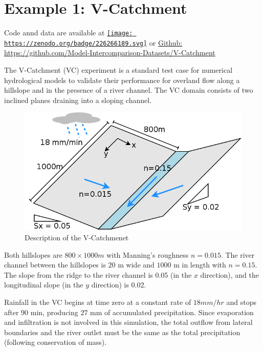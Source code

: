 \documentclass[
]{scrbook}
\begin{document}
\hypertarget{example-1-v-catchment}{%
\section{Example 1: V-Catchment}\label{example-1-v-catchment}}

Code annd data are available at \href{https://zenodo.org/badge/latestdoi/226266189}{\texttt{[image: https://zenodo.org/badge/226266189.svg]}} or \href{https://github.com/Model-Intercomparison-Datasets/V-Catchment}{Github: https://github.com/Model-Intercomparison-Datasets/V-Catchment}

The V-Catchment (VC) experiment is a standard test case for numerical hydrological models to validate their performance for overland flow along a hillslope and in the presence of a river channel.
The VC domain consists of two inclined planes draining into a sloping channel.

\begin{figure}
\centering
\includegraphics{Fig/Example/vCat/Vcat.png}
\caption{Description of the V-Catchmenet}
\end{figure}

Both hillslopes are \(800 \times 1000 m\) with Manning's roughness \(n=0.015\). The river channel between the hillslopes is \(20\) m wide and \(1000\) m in length with \(n=0.15\). The slope from the ridge to the river channel is 0.05 (in the \(x\) direction), and the longitudinal slope (in the \(y\) direction) is 0.02.

Rainfall in the VC begins at time zero at a constant rate of \(18 mm/hr\) and stops after 90 min, producing \(27\) mm of accumulated precipitation. Since evaporation and infiltration is not involved in this simulation, the total outflow from lateral boundaries and the river outlet must be the same as the total precipitation (following conservation of mass).
\end{document}
